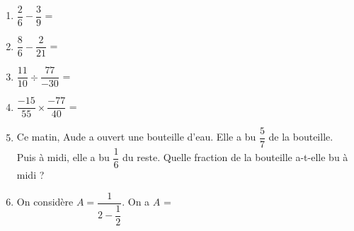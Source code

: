 \documentclass[a4paper,11pt]{article}
\begin{document}

\vspace*{1cm}
\begin{seance}{} %

\begin{enumerate}
\item $\dfrac{2}{6}-\dfrac{3}{9}$ = \dotfill

\item $\dfrac{8}{6}-\dfrac{2}{21}$ = \dotfill

\item $\dfrac{11}{10} \div \dfrac{77}{-30}$ = \dotfill

\item $\dfrac{-15}{55}\times\dfrac{-77}{40}$ = \dotfill

\item Ce matin, Aude a ouvert une bouteille d'eau. Elle a bu $\dfrac{5}{7}$ de la bouteille. \\
Puis à midi, elle a bu $\dfrac{1}{6}$ du reste. Quelle fraction de la bouteille a-t-elle bu à midi ?

\dotfill

\item On considère $A=\dfrac{1}{2-\dfrac{1}{2}}$. On a $A$ = \dotfill

\end{enumerate}

\end{seance}



\end{document}
